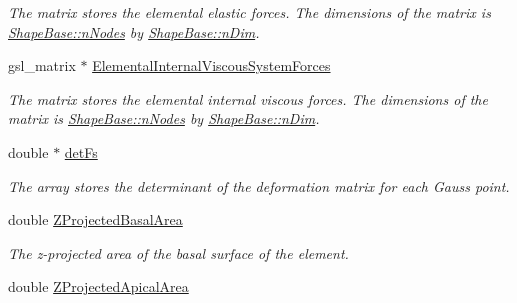 \begin{DoxyCompactItemize}
\begin{DoxyCompactList}\small\item\em The matrix stores the elemental elastic forces. The dimensions of the matrix is \hyperlink{classShapeBase_ae7dd93b58b3281ce90025f83d0f0e976}{Shape\+Base\+::n\+Nodes} by \hyperlink{classShapeBase_a250bd3396546342c8104f5b9c180d18f}{Shape\+Base\+::n\+Dim}. \end{DoxyCompactList}\item 
\hypertarget{classShapeBase_a54b5ebd33ad4ed5739c0431bf0d4346d}{}gsl\+\_\+matrix $\ast$ \hyperlink{classShapeBase_a54b5ebd33ad4ed5739c0431bf0d4346d}{Elemental\+Internal\+Viscous\+System\+Forces}\label{classShapeBase_a54b5ebd33ad4ed5739c0431bf0d4346d}

\begin{DoxyCompactList}\small\item\em The matrix stores the elemental internal viscous forces. The dimensions of the matrix is \hyperlink{classShapeBase_ae7dd93b58b3281ce90025f83d0f0e976}{Shape\+Base\+::n\+Nodes} by \hyperlink{classShapeBase_a250bd3396546342c8104f5b9c180d18f}{Shape\+Base\+::n\+Dim}. \end{DoxyCompactList}\item 
\hypertarget{classShapeBase_ab41f6a16647607b1c898eea1c2860367}{}double $\ast$ \hyperlink{classShapeBase_ab41f6a16647607b1c898eea1c2860367}{det\+Fs}\label{classShapeBase_ab41f6a16647607b1c898eea1c2860367}

\begin{DoxyCompactList}\small\item\em The array stores the determinant of the deformation matrix for each Gauss point. \end{DoxyCompactList}\item 
\hypertarget{classShapeBase_a51a8101057e2771172a4716c128705d7}{}double \hyperlink{classShapeBase_a51a8101057e2771172a4716c128705d7}{Z\+Projected\+Basal\+Area}\label{classShapeBase_a51a8101057e2771172a4716c128705d7}

\begin{DoxyCompactList}\small\item\em The z-\/projected area of the basal surface of the element. \end{DoxyCompactList}\item 
\hypertarget{classShapeBase_aa7043ddacbcd92480cb54467a2777627}{}double \hyperlink{classShapeBase_aa7043ddacbcd92480cb54467a2777627}{Z\+Projected\+Apical\+Area}\label{classShapeBase_aa7043ddacbcd92480cb54467a2777627}


\end{DoxyCompactItemize}
